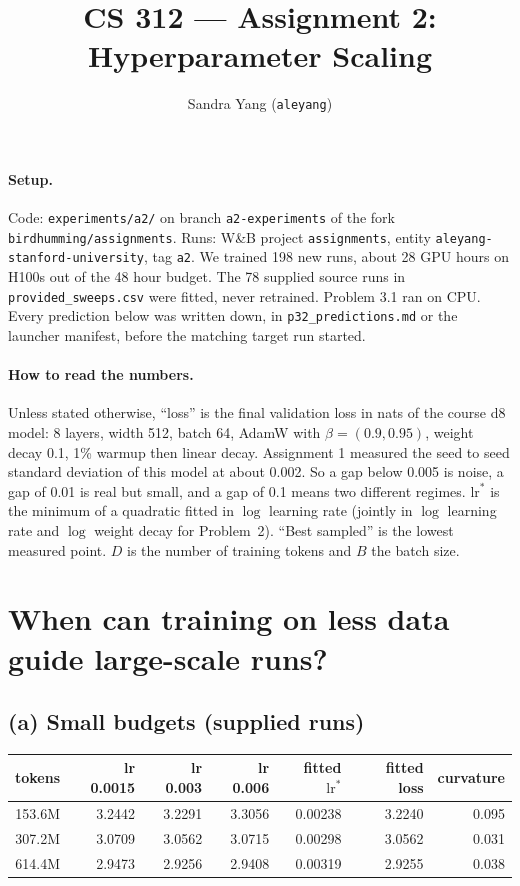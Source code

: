 \documentclass[10pt,letterpaper]{article}
\title{\vspace{-1.6em}CS 312 --- Assignment 2: Hyperparameter Scaling\vspace{-0.4em}}
\author{Sandra Yang (\texttt{aleyang})}
\date{\vspace{-0.6em}}
\newcommand{\lrs}{\ensuremath{\mathrm{lr}^{*}}}
\begin{document}
\maketitle
\vspace{-2em}

\paragraph{Setup.} Code: \texttt{experiments/a2/} on branch \texttt{a2-experiments} of the fork \texttt{birdhumming/assignments}. Runs: W\&B project \texttt{assignments}, entity \texttt{aleyang-stanford-university}, tag \texttt{a2}. We trained 198 new runs, about 28 GPU hours on H100s out of the 48 hour budget. The 78 supplied source runs in \texttt{provided\_sweeps.csv} were fitted, never retrained. Problem 3.1 ran on CPU. Every prediction below was written down, in \texttt{p32\_predictions.md} or the launcher manifest, before the matching target run started.

\paragraph{How to read the numbers.} Unless stated otherwise, ``loss'' is the final validation loss in nats of the course d8 model: 8 layers, width 512, batch 64, AdamW with $\beta=(0.9,0.95)$, weight decay 0.1, 1\% warmup then linear decay. Assignment 1 measured the seed to seed standard deviation of this model at about 0.002. So a gap below 0.005 is noise, a gap of 0.01 is real but small, and a gap of 0.1 means two different regimes. $\lrs$ is the minimum of a quadratic fitted in $\log$ learning rate (jointly in $\log$ learning rate and $\log$ weight decay for Problem~2). ``Best sampled'' is the lowest measured point. $D$ is the number of training tokens and $B$ the batch size.

\section{When can training on less data guide large-scale runs?}

\subsection*{(a) Small budgets (supplied runs)}

\begin{table}[H]\centering\small
\begin{tabular}{rrrrrrr}\toprule
tokens & lr 0.0015 & lr 0.003 & lr 0.006 & fitted $\lrs$ & fitted loss & curvature\\\midrule
153.6M & 3.2442 & 3.2291 & 3.3056 & 0.00238 & 3.2240 & 0.095\\
307.2M & 3.0709 & 3.0562 & 3.0715 & 0.00298 & 3.0562 & 0.031\\
614.4M & 2.9473 & 2.9256 & 2.9408 & 0.00319 & 2.9255 & 0.038\\\bottomrule
\end{tabular}
\end{table}
\end{document}
